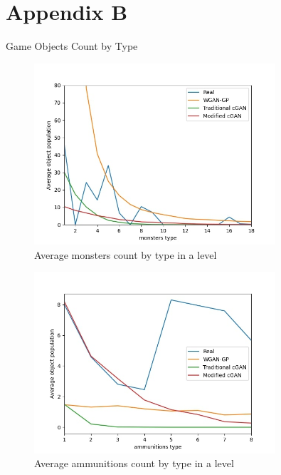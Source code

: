 \documentclass{Configuration_Files/PoliMi3i_thesis}
\begin{document}
\chapter{Appendix B}
\label{appendixb}
\begin{large}
Game Objects Count by Type
\end{large}
\begin{figure}[H]
    \centering
    \includegraphics[width=0.8\textwidth]{monsters_count.jpg}
    \caption{Average monsters count by type in a level}
    \label{fig:monstercount}
\end{figure}
\begin{figure}[H]
    \centering
    \includegraphics[width=0.8\textwidth]{ammunitions_count.jpg}
    \caption{Average ammunitions count by type in a level}
    \label{fig:ammunitionscount}
\end{figure}
\end{document}
